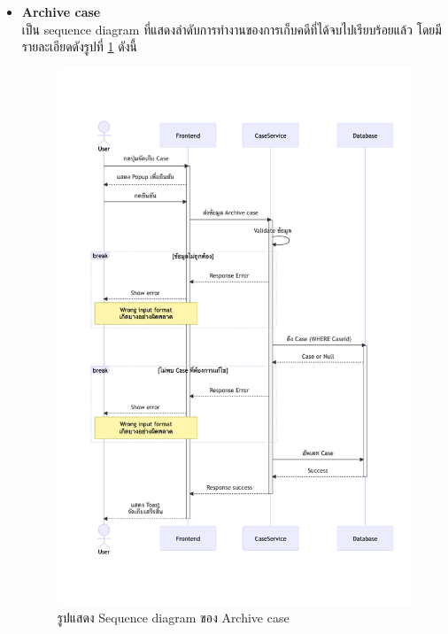 \documentclass[12pt,oneside,openright,a4paper]{cpe-thai-project}
\begin{document}
\begin{itemize}
    \newpage
    \item \textbf{Archive case} \\
    เป็น sequence diagram ที่แสดงลำดับการทำงานของการเก็บคดีที่ได้จบไปเรียบร้อยแล้ว โดยมีรายละเอียดดังรูปที่ \ref{fig:sqArchiveCase} ดังนี้ 
    \begin{figure}[!ht]\centering
        \includegraphics[width=15cm, trim={1cm 3cm 0.5cm 3cm},clip]{./assets/sequence-diagram/archive-case.png}
        \caption{รูปแสดง Sequence diagram ของ Archive case}\label{fig:sqArchiveCase}
    \end{figure}


\end{itemize}
\end{document}
